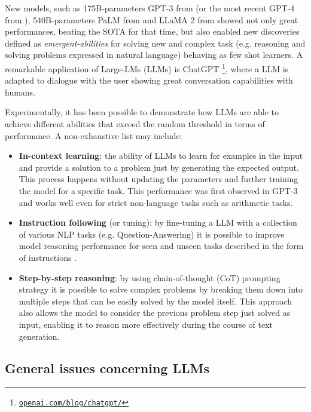 New models, such as 175B-parameters GPT-3 from \citet{brown2020language} (or the most recent GPT-4 from \citet{openai2023gpt4}), 540B-parameters PaLM from \citet{chowdhery2022palm} and LLaMA 2 from \citet{touvron2023llama} showed not only great performances, beating the SOTA for that time, but also enabled new discoveries defined as \textit{emergent-abilities} \citep{wei2022emergent} for solving new and complex task (e.g. reasoning and solving problems expressed in natural language) behaving as few shot learners. A remarkable application of Large-LMs (LLMs) is ChatGPT \footnote{\href{https://openai.com/blog/chatgpt/}{\texttt{openai.com/blog/chatgpt/}}}, where a LLM is adapted to dialogue with the user showing great conversation capabilities with humans.


Experimentally, it has been possible to demonstrate how LLMs are able to achieve different abilities that exceed the random threshold in terms of performance. A non-exhaustive list may include:
\begin{itemize}
    \item \textbf{In-context learning}: the ability of LLMs to learn for examples in the input and provide a solution to a problem just by generating the expected output. This process happens without updating the parameters and further training the model for a specific task. This performance was first observed in GPT-3 \citep{brown2020language} and works well even for strict non-language tasks such as arithmetic tasks.
    \item \textbf{Instruction following} (or tuning): by fine-tuning a LLM with a collection of various NLP tasks (e.g. Question-Answering) it is possible to improve model reasoning performance for seen and unseen tasks described in the form of instructions \citep{NEURIPS2022_b1efde53, sanh2022multitask, wei2022finetuned}.
    \item \textbf{Step-by-step reasoning}: by using chain-of-thought (CoT) prompting strategy \citep{wei2023chainofthought} it is possible to solve complex problems by breaking them down into multiple steps that can be easily solved by the model itself. This approach also allows the model to consider the previous problem step just solved as input, enabling it to reason more effectively during the course of text generation.
\end{itemize}

\subsection{General issues concerning LLMs}

